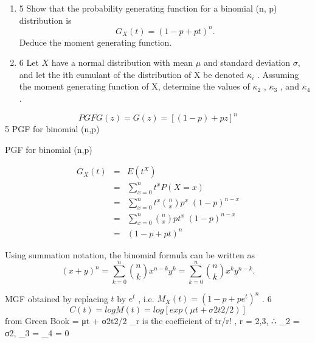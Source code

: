 \documentclass[a4paper,12pt]{article}
\begin{document}
\begin{enumerate}
\item 5 Show that the probability generating function for a binomial (n, p) distribution is
\[ G_X (t) = (1 − p + pt)^n .\]
Deduce the moment generating function. 
\item 6 Let $X$ have a normal distribution with mean $\mu$ and standard deviation $\sigma$, and let
the ith cumulant of the distribution of X be denoted $\kappa_i$ .
Assuming the moment generating function of X, determine the values of $\kappa_2$ , $\kappa_3$ ,
and $\kappa_4$ . 


\end{enumerate}
\newpage
\[PGF	G ( z ) = {\displaystyle G(z)=[(1-p)+pz]^{n}} \]
5 PGF for binomial (n,p)


PGF for binomial (n,p)


\begin{eqnarray*}
G_X(t) 
&=& E(t^X) \\ 
&=& \sum^{n}_{x=0} t^x P(X = x)  \\
&=& \sum^{n}_{x=0} t^x  {n \choose x} p^x \;(1-p)^{n-x} \\
&=& \sum^{n}_{x=0} {n \choose x} pt^x \;(1-p)^{n-x}\\
&=& (1 - p + pt)^{n}
\end{eqnarray*}


\begin{framed}
 Using summation notation, the binomial formula can be written as 
\[ {\displaystyle (x+y)^{n}=\sum _{k=0}^{n}{n \choose k}x^{n-k}y^{k}=\sum _{k=0}^{n}{n \choose k}x^{k}y^{n-k}.} \]
\end{framed}

MGF obtained by replacing $t$ by $e^t$ , i.e. $ { \displaystyle M_X ( t ) = (1 − p + pe^t )^n}$ .
6 \[C(t) = logM(t) = log[exp(μt + σ2t2/2)] \]from Green Book
= μt + σ2t2/2
\kappa_r is the coefficient of tr/r! , r = 2,3,
∴ \kappa_2 = σ2, \kappa_3 = \kappa_4 = 0
\end{document}
